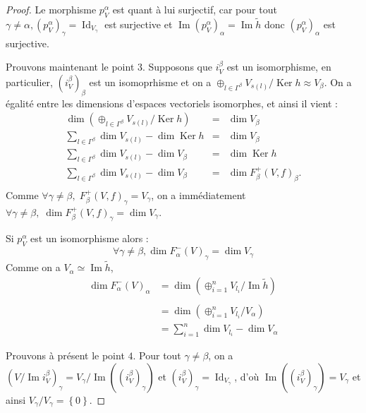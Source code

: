\documentclass[a4paper,10pt]{article}
\DeclareMathOperator{\Ker}{Ker}
\DeclareMathOperator{\Id}{Id}
\DeclareMathOperator{\Img}{Im}
\begin{document}
\begin{proof}
Le morphisme $p_{V}^{\alpha}$ est quant à lui surjectif, car pour tout $\gamma \neq \alpha, (p_{V}^{\alpha})_{\gamma} = \Id_{V_{\gamma}}$ est surjective et $ \Img (p_{V}^{\alpha})_{\alpha} = \Img \tilde{h}$ donc $ (p_{V}^{\alpha})_{\alpha}$ est surjective.  

	Prouvons maintenant le point $3$. Supposons que $i_{V}^{\beta}$ est un isomorphisme, en particulier, $(i_{V}^{\beta})_{\beta}$ est un isomoprhisme et on a $\oplus_{l\in\Gamma^{\beta}}V_{s(l)}/\Ker h\approx V_{\beta}$. On a égalité entre les dimensions d'espaces vectoriels isomorphes, et ainsi il vient :
	\[
\begin{array}{rll}
	\dim(\oplus_{l\in\Gamma^{\beta}}V_{s(l)}/\Ker h) &=& \dim V_{\beta}\\
	\sum_{l\in\Gamma^{\beta}}\dim V_{s(l)}-\dim\Ker h &=& \dim V_{\beta}\\
	\sum_{l\in\Gamma^{\beta}}\dim V_{s(l)}-\dim V_{\beta} &=& \dim\Ker h\\
	\sum_{l\in\Gamma^{\beta}}\dim V_{s(l)}-\dim V_{\beta} &=& \dim F_{\beta}^{+}(V,f)_{\beta}.\\
\end{array}
	\]
	Comme $\forall \gamma\neq\beta,\;F_{\beta}^{+}(V,f)_{\gamma}=V_{\gamma}$, on a immédiatement $\forall \gamma\neq\beta,\;\dim F_{\beta}^{+}(V,f)_{\gamma}=\dim V_{\gamma}$.

        Si $p_{V}^{\alpha}$ est un isomorphisme alors : 
        \[
        \forall \gamma \neq \beta, \dim F_{\alpha}^{-}(V)_{\gamma} = \dim V_{\gamma}
        \]
        Comme on a $V_{\alpha} \simeq \Img \tilde{h}$,
        \[
        \begin{array}{rl}
        \dim F_{\alpha}^{-}(V)_{\alpha} &= \dim\left( \oplus_{i=1}^{n} V_{l_{i}} / \Img \tilde{h} \right) \\ \\
                                        &= \dim\left( \oplus_{i=1}^{n} V_{l_{i}} / V_{\alpha} \right) \\
                                        &= \sum_{i=1}^{n} \dim V_{l_{i}} - \dim V_{\alpha}
\end{array}
        \]


	Prouvons à présent le point $4$. Pour tout $\gamma\neq\beta$, on a $(V/\Img i_{V}^{\beta})_{\gamma}=V_{\gamma}/\Img((i_{V}^{\beta})_{\gamma})$ et $(i_{V}^{\beta})_{\gamma}=\Id_{V_{\gamma}}$, d'où $\Img((i_{V}^{\beta})_{\gamma})=V_{\gamma}$ et ainsi $V_{\gamma}/V_{\gamma}=\left\{ 0 \right\}$.


\end{proof}
\end{document}
